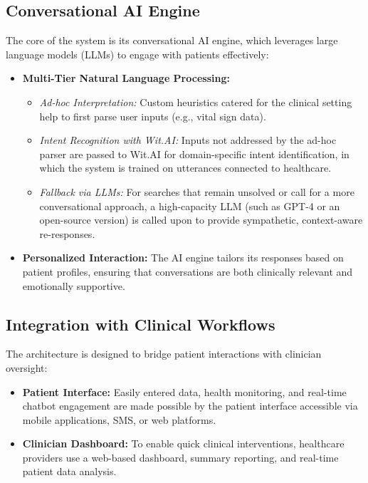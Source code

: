 \subsection{Conversational AI Engine}
The core of the system is its conversational AI engine, which leverages large language models (LLMs) to engage with patients effectively:
\begin{itemize}[itemsep=2em]
    \item \textbf{Multi-Tier Natural Language Processing:} 
    \begin{itemize}[itemsep=2em]
        \item \emph{Ad-hoc Interpretation:} Custom heuristics catered for the clinical setting help to first parse user inputs (e.g., vital sign data).
        \item \emph{Intent Recognition with Wit.AI:} Inputs not addressed by the ad-hoc parser are passed to Wit.AI for domain-specific intent identification, in which the system is trained on utterances connected to healthcare.
        \item \emph{Fallback via LLMs:} For searches that remain unsolved or call for a more conversational approach, a high-capacity LLM (such as GPT-4 or an open-source version) is called upon to provide sympathetic, context-aware re-responses.
    \end{itemize}
    \item \textbf{Personalized Interaction:} The AI engine tailors its responses based on patient profiles, ensuring that conversations are both clinically relevant and emotionally supportive.
\end{itemize}

\subsection{Integration with Clinical Workflows}
The architecture is designed to bridge patient interactions with clinician oversight:
\begin{itemize}[itemsep=2em]
    \item \textbf{Patient Interface:} Easily entered data, health monitoring, and real-time chatbot engagement are made possible by the patient interface accessible via mobile applications, SMS, or web platforms.
    \item \textbf{Clinician Dashboard:} To enable quick clinical interventions, healthcare providers use a web-based dashboard, summary reporting, and real-time patient data analysis.
\end{itemize}

